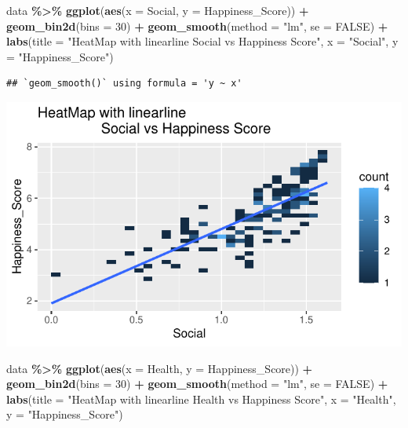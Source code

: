 \documentclass[
  11pt,
]{article}
\newenvironment{Shaded}{\begin{snugshade}}{\end{snugshade}}
\newcommand{\AttributeTok}[1]{\textcolor[rgb]{0.13,0.29,0.53}{#1}}
\newcommand{\ConstantTok}[1]{\textcolor[rgb]{0.56,0.35,0.01}{#1}}
\newcommand{\DecValTok}[1]{\textcolor[rgb]{0.00,0.00,0.81}{#1}}
\newcommand{\FunctionTok}[1]{\textcolor[rgb]{0.13,0.29,0.53}{\textbf{#1}}}
\newcommand{\NormalTok}[1]{#1}
\newcommand{\SpecialCharTok}[1]{\textcolor[rgb]{0.81,0.36,0.00}{\textbf{#1}}}
\newcommand{\StringTok}[1]{\textcolor[rgb]{0.31,0.60,0.02}{#1}}
\begin{document}
\begin{Shaded}
\begin{Highlighting}[]
\NormalTok{data }\SpecialCharTok{\%\textgreater{}\%}
\FunctionTok{ggplot}\NormalTok{(}\FunctionTok{aes}\NormalTok{(}\AttributeTok{x =}\NormalTok{ Social, }\AttributeTok{y =}\NormalTok{ Happiness\_Score)) }\SpecialCharTok{+}
  \FunctionTok{geom\_bin2d}\NormalTok{(}\AttributeTok{bins =} \DecValTok{30}\NormalTok{) }\SpecialCharTok{+}  
  \FunctionTok{geom\_smooth}\NormalTok{(}\AttributeTok{method =} \StringTok{"lm"}\NormalTok{, }\AttributeTok{se =} \ConstantTok{FALSE}\NormalTok{) }\SpecialCharTok{+} 
  \FunctionTok{labs}\NormalTok{(}\AttributeTok{title =} \StringTok{"HeatMap with linearline }
\StringTok{                Social vs Happiness Score"}\NormalTok{, }
           \AttributeTok{x =} \StringTok{"Social"}\NormalTok{, }\AttributeTok{y =} \StringTok{"Happiness\_Score"}\NormalTok{)}
\end{Highlighting}
\end{Shaded}

\begin{verbatim}
## `geom_smooth()` using formula = 'y ~ x'
\end{verbatim}

\begin{center}\includegraphics[width=0.7\linewidth]{Group_project_2_files/figure-latex/unnamed-chunk-15-1} \end{center}

\begin{Shaded}
\begin{Highlighting}[]
\NormalTok{data }\SpecialCharTok{\%\textgreater{}\%}
\FunctionTok{ggplot}\NormalTok{(}\FunctionTok{aes}\NormalTok{(}\AttributeTok{x =}\NormalTok{ Health, }\AttributeTok{y =}\NormalTok{ Happiness\_Score)) }\SpecialCharTok{+}
  \FunctionTok{geom\_bin2d}\NormalTok{(}\AttributeTok{bins =} \DecValTok{30}\NormalTok{) }\SpecialCharTok{+}  
  \FunctionTok{geom\_smooth}\NormalTok{(}\AttributeTok{method =} \StringTok{"lm"}\NormalTok{, }\AttributeTok{se =} \ConstantTok{FALSE}\NormalTok{) }\SpecialCharTok{+} 
  \FunctionTok{labs}\NormalTok{(}\AttributeTok{title =} \StringTok{"HeatMap with linearline }
\StringTok{                Health vs Happiness Score"}\NormalTok{, }
           \AttributeTok{x =} \StringTok{"Health"}\NormalTok{, }\AttributeTok{y =} \StringTok{"Happiness\_Score"}\NormalTok{)}
\end{Highlighting}
\end{Shaded}
\end{document}

